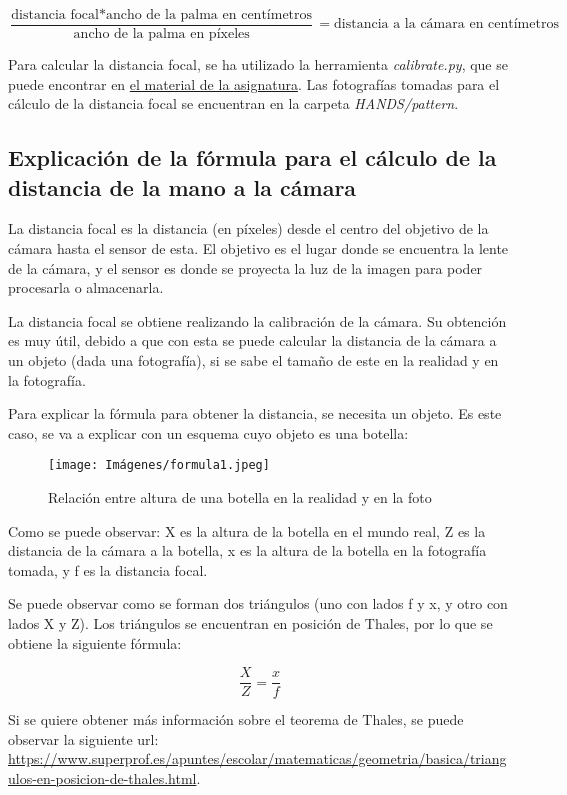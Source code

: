 \documentclass[12pt]{article}
\begin{document}
$$\frac{\text{distancia focal} * \text{ancho de la palma en centímetros}}{\text{ancho de la palma en píxeles}} = \text{distancia a la cámara en centímetros}$$

Para calcular la distancia focal, se ha utilizado la herramienta \textit{calibrate.py}, que se puede encontrar en \href{https://github.com/albertoruiz/umucv/tree/master/code/calibrate}{el material de la asignatura}. Las fotografías tomadas para el cálculo de la distancia focal se encuentran en la carpeta \textit{HANDS/pattern}.

\subsection*{Explicación de la fórmula para el cálculo de la distancia de la mano a la cámara}

La distancia focal es la distancia (en píxeles) desde el centro del objetivo de la cámara hasta el sensor de esta. El objetivo es el lugar donde se encuentra la lente de la cámara, y el sensor es donde se proyecta la luz de la imagen para poder procesarla o almacenarla.

La distancia focal se obtiene realizando la calibración de la cámara. Su obtención es muy útil, debido a que con esta se puede calcular la distancia de la cámara a un objeto (dada una fotografía), si se sabe el tamaño de este en la realidad y en la fotografía.

Para explicar la fórmula para obtener la distancia, se necesita un objeto. Es este caso, se va a explicar con un esquema cuyo objeto es una botella:

\begin{figure}[H]
    \centering
    \texttt{[image: Imágenes/formula1.jpeg]}
    \caption{Relación entre altura de una botella en la realidad y en la foto}
    \label{fig:semana2FOV}
\end{figure}

Como se puede observar: X es la altura de la botella en el mundo real, Z es la distancia de la cámara a la botella, x es la altura de la botella en la fotografía tomada, y f es la distancia focal.

Se puede observar como se forman dos triángulos (uno con lados f y x, y otro con lados X y Z). Los triángulos se encuentran en posición de Thales, por lo que se obtiene la siguiente fórmula:

$$\frac{X}{Z}=\frac{x}{f}$$

Si se quiere obtener más información sobre el teorema de Thales, se puede observar la siguiente url: \url{https://www.superprof.es/apuntes/escolar/matematicas/geometria/basica/triangulos-en-posicion-de-thales.html}.
\end{document}
